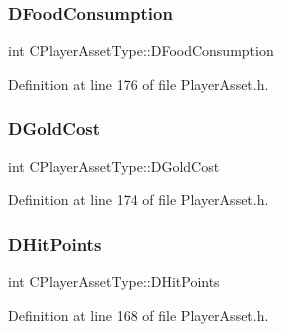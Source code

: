 \hypertarget{classCPlayerAssetType_a8fcab35c2b576476b6f2c80c8b8762fb}{}\label{classCPlayerAssetType_a8fcab35c2b576476b6f2c80c8b8762fb} 
\subsubsection{\texorpdfstring{D\+Food\+Consumption}{DFoodConsumption}}
{\footnotesize\ttfamily int C\+Player\+Asset\+Type\+::\+D\+Food\+Consumption\hspace{0.3cm}{\ttfamily [protected]}}



Definition at line 176 of file Player\+Asset.\+h.

\hypertarget{classCPlayerAssetType_a2153f3ed158144fc517efd2866de0017}{}\label{classCPlayerAssetType_a2153f3ed158144fc517efd2866de0017} 
\subsubsection{\texorpdfstring{D\+Gold\+Cost}{DGoldCost}}
{\footnotesize\ttfamily int C\+Player\+Asset\+Type\+::\+D\+Gold\+Cost\hspace{0.3cm}{\ttfamily [protected]}}



Definition at line 174 of file Player\+Asset.\+h.

\hypertarget{classCPlayerAssetType_a0f10bff263838914bf347d9e9bf0af68}{}\label{classCPlayerAssetType_a0f10bff263838914bf347d9e9bf0af68} 
\subsubsection{\texorpdfstring{D\+Hit\+Points}{DHitPoints}}
{\footnotesize\ttfamily int C\+Player\+Asset\+Type\+::\+D\+Hit\+Points\hspace{0.3cm}{\ttfamily [protected]}}



Definition at line 168 of file Player\+Asset.\+h.

